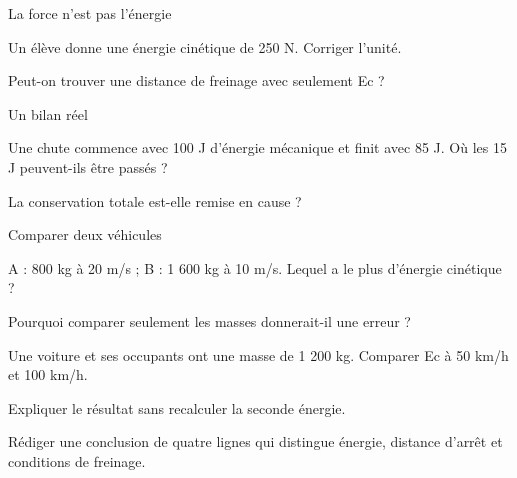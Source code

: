 \par\noindent\begin{minipage}{\linewidth}
\begin{exercice}[3]{La force n’est pas l’énergie}
\begin{questions}
\item Un élève donne une énergie cinétique de 250 N. Corriger l’unité.
\item Peut-on trouver une distance de freinage avec seulement Ec ?
\end{questions}
\end{exercice}
\end{minipage}
\par\noindent\begin{minipage}{\linewidth}
\begin{exercice}[3]{Un bilan réel}
\begin{questions}
\item Une chute commence avec 100 J d’énergie mécanique et finit avec 85 J. Où les 15 J peuvent-ils être passés ?
\item La conservation totale est-elle remise en cause ?
\end{questions}
\end{exercice}
\end{minipage}
\par\noindent\begin{minipage}{\linewidth}
\begin{exercice}[3]{Comparer deux véhicules}
\begin{questions}
\item A : 800 kg à 20 m/s ; B : 1 600 kg à 10 m/s. Lequel a le plus d’énergie cinétique ?
\item Pourquoi comparer seulement les masses donnerait-il une erreur ?
\end{questions}
\end{exercice}
\end{minipage}
\label{defi-ex-11}
\begin{questions}
\item Une voiture et ses occupants ont une masse de 1 200 kg. Comparer Ec à 50 km/h et 100 km/h.
\item Expliquer le résultat sans recalculer la seconde énergie.
\item Rédiger une conclusion de quatre lignes qui distingue énergie, distance d’arrêt et conditions de freinage.
\end{questions}
\pcGrille
